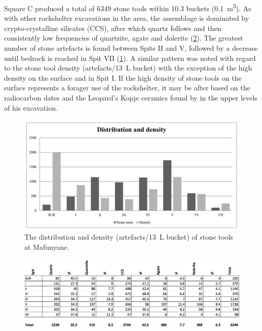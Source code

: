 \documentclass{ijsra}
\begin{document}

Square C  produced a total of \num{6349} stone tools within \num{10.3} buckets (\SI{0.1}{\meter\cubed}). 
As with other rockshelter excavations in the area, the assemblage is dominated by crypto-crystalline silicates (CCS), 
after which quartz follows and then consistently low frequencies of quartzite, agate and dolerite (\cref{fig:Forssman-Table02}). 
The greatest number of stone artefacts is found between Spits II and V, 
followed by a decrease until bedrock is reached in Spit VII (\cref{fig:Forssman-Figure04}).
A similar pattern was noted with regard to the stone tool density (artefacts/\SI{13}{\liter} bucket) with the exception of the high density on the surface and in Spit I. 
If the high density of stone tools on the surface represents a forager use of the rockshelter, it may be after  based on the radiocarbon dates and the Leopard’s Kopje ceramics found by \textcite{Walker_1994} in the upper levels of his excavation. 


	\begin{figure} %
		\includegraphics[width=\linewidth]{figures/Forssman-Figure04}
		\caption{The distribution and density (artefacts/\SI{13}{\liter} bucket) of stone tools at Mafunyane.}
		\label{fig:Forssman-Figure04}
	\end{figure}

	\begin{figure} %
		\includegraphics[width=\linewidth]{figures/Forssman-Table02}
		\label{fig:Forssman-Table02}
	\end{figure}
\end{document}
